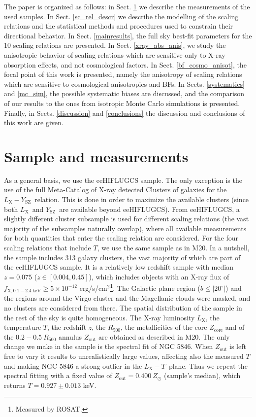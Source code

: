 \documentclass{aa}   %
\newcommand{\LT}{$L_{\text{X}}-T$}
\newcommand{\LY}{$L_{\text{X}}-Y_{\text{SZ}}$}
\newcommand{\Lx}{$L_{\text{X}}$}
\newcommand{\Ysz}{$Y_{\text{SZ}}$}
\begin{document}
The paper is organized as follows: in Sect. \ref{sample} we describe the measurements of the used samples. In Sect. \ref{sc_rel_descr} we describe the modelling of the scaling relations and the statistical methods and procedures used to constrain their directional behavior. In Sect. \ref{mainresults}, the full sky best-fit parameters for the 10 scaling relations are presented. In Sect. \ref{xray_abs_anis}, we study the anisotropic behavior of scaling relations which are sensitive only to X-ray absorption effects, and not cosmological factors. In Sect. \ref{bf_cosmo_anisot}, the focal point of this work is presented, namely the anisotropy of scaling relations which are sensitive to cosmological anisotropies and BFs. In Sects. \ref{systematics} and \ref{mc_sim}, the possible systematic biases are discussed, and the comparison of our results to the ones from isotropic Monte Carlo simulations is presented. Finally, in Sects. \ref{discussion} and \ref{conclusions} the discussion and conclusions of this work are given.

\section{Sample and measurements}\label{sample}

As a general basis, we use the eeHIFLUGCS sample. The only exception is the use of the full Meta-Catalog of X-ray detected Clusters of galaxies \citep[MCXC,][]{mcxc} for the \LY\ relation. This is done in order to maximize the available clusters (since both \Lx\ and \Ysz\ are available beyond eeHIFLUGCS). From eeHIFLUGCS, a slightly different cluster subsample is used for different scaling relations (the vast majority of the subsamples naturally overlap), where all available measurements for both quantities that enter the scaling relation are considered. For the four scaling relations that include $T$, we use the same sample as in M20. In a nutshell, the sample includes 313 galaxy clusters, the vast majority of which are part of the eeHIFLUGCS sample. It is a relatively low redshift sample with median $z=0.075$ ($z\in [0.004,0.45]$), which includes objects with an X-ray flux of $f_{\text{X}, 0.1-2.4\ \text{keV}}\geq 5\times 10^{-12}$ erg/s/cm$^2$\footnote{Measured by ROSAT.}. The Galactic plane region ($b\leq |20^{\circ}|$) and the regions around the Virgo cluster and the Magellanic clouds were masked, and no clusters are considered from there. The spatial distribution of the sample in the rest of the sky is quite homogeneous. The X-ray luminosity \Lx, the temperature $T$, the redshift $z$, the $R_{500}$, the metallicities of the core $Z_{\text{core}}$ and of the $0.2-0.5\ R_{500}$ annulus $Z_{\text{out}}$ are obtained as described in M20. The only change we make in the sample is the spectral fit of NGC 5846. When $Z_{\text{out}}$ is left free to vary it results to unrealistically large values, affecting also the measured $T$ and making NGC 5846 a strong outlier in the \LT\ plane. Thus we repeat the spectral fitting with a fixed value of $Z_{\text{out}}=0.400\ Z_{\odot}$ (sample's median), which returns $T=0.927\pm 0.013$ keV. 
\end{document}
